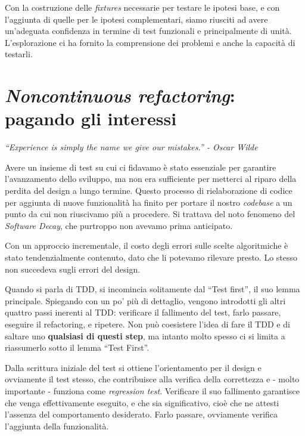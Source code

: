 \documentclass[12pt]{report}
\begin{document}
Con la costruzione delle \textit{fixtures} necessarie per testare
le ipotesi base, e con l'aggiunta di quelle per le ipotesi complementari,
siamo riusciti ad avere un'adeguata confidenza in termine di 
test funzionali e principalmente di unità. L'esplorazione ci 
ha fornito la comprensione dei
problemi e anche la capacità di testarli.

\section{\textit{Noncontinuous refactoring}: pagando gli interessi}

\vspace{3mm}
\begin{flushright}
\textit{``Experience is simply the name we give our mistakes.'' - Oscar Wilde}
\end{flushright}
\vspace{8mm}

Avere un insieme di test su cui ci fidavamo è stato essenziale per
garantire l'avanzamento dello sviluppo, ma
non era sufficiente per metterci al riparo della perdita del
design a lungo termine. Questo processo di rielaborazione di 
codice per aggiunta di nuove funzionalità ha finito per portare 
il nostro \textit{codebase} a un punto da cui non riuscivamo più a procedere.
Si trattava del noto fenomeno del \textit{Software Decay}, che purtroppo
non avevamo prima anticipato.

Con un approccio incrementale, il costo degli errori sulle scelte
algoritmiche è stato tendenzialmente contenuto, dato che li potevamo
rilevare presto. Lo stesso non succedeva sugli errori del design.

Quando si parla di TDD, si incomincia solitamente dal ``Test first'', 
il suo lemma principale. Spiegando con un po' più di dettaglio, vengono 
introdotti gli altri quattro passi inerenti al TDD: verificare il 
fallimento del test, farlo passare, eseguire il refactoring, e ripetere. 
Non può coesistere l'idea di fare il TDD e di saltare uno 
\textbf{qualsiasi di questi step}, ma intanto molto spesso ci si limita
a riassumerlo sotto il lemma ``Test First''. 

Dalla scrittura iniziale del test si ottiene l'orientamento per il design 
e ovviamente il test stesso, che contribuisce alla verifica della correttezza
e - molto importante - funziona come \textit{regression test}.
Verificare il suo fallimento garantisce che venga effettivamente eseguito, 
e che sia significativo, cioè che ne attesti l'assenza del
comportamento desiderato. Farlo passare, ovviamente verifica
l'aggiunta della funzionalità. 
\end{document}
